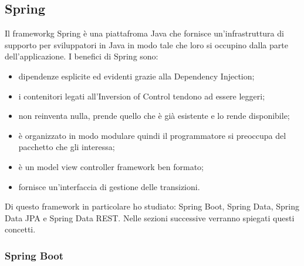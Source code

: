 \subsection{Spring}
\label{subsec:spring}

Il \gls{frameworkg} Spring è una piattafroma Java che fornisce un'infrastruttura di supporto per sviluppatori in Java in modo tale che loro si occupino dalla parte dell'applicazione. I benefici di Spring sono:
\begin{itemize}
	\item dipendenze esplicite ed evidenti grazie alla Dependency Injection;
	\item i contenitori legati all'Inversion of Control tendono ad essere leggeri;
	\item non reinventa nulla, prende quello che è già esistente e lo rende disponibile;
	\item è organizzato in modo modulare quindi il programmatore si preoccupa del pacchetto che gli interessa;
	\item è un model view controller framework ben formato;
	\item fornisce un'interfaccia di gestione delle transizioni.
\end{itemize}
Di questo framework in particolare ho studiato: Spring Boot, Spring Data, Spring Data JPA e Spring Data REST. Nelle sezioni successive verranno spiegati questi concetti.

\subsubsection{Spring Boot}
\label{subsubsec:spring-boot}


